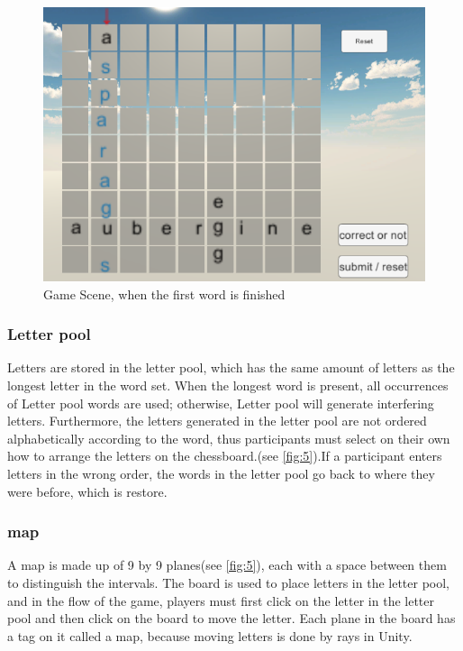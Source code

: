 \documentclass{vgtc}                          %
\begin{document}
\begin{figure}[H]
 \centering
 \includegraphics[width=\columnwidth]{pictures/Ingame.png}
 \caption{Game Scene, when the first word is finished}
 \label{fig:7}
\end{figure}
\subsubsection{Letter pool}
Letters are stored in the letter pool, which has the same amount of letters as the longest letter in the word set. When the longest word is present, all occurrences of Letter pool words are used; otherwise, Letter pool will generate interfering letters. Furthermore, the letters generated in the letter pool are not ordered alphabetically according to the word, thus participants must select on their own how to arrange the letters on the chessboard.(see \autoref{fig:5}).If a participant enters letters in the wrong order, the words in the letter pool go back to where they were before, which is restore.  
\subsubsection{map}
A map is made up of 9 by 9 planes(see \autoref{fig:5}), each with a space between them to distinguish the intervals.  The board is used to place letters in the letter pool, and in the flow of the game, players must first click on the letter in the letter pool and then click on the board to move the letter.  Each plane in the board has a tag on it called a map, because moving letters is done by rays in Unity.  
\end{document}
